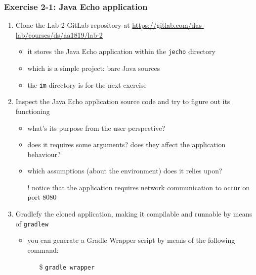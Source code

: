 \documentclass[handout]{beamer}\mode<presentation>{\usetheme{AMSCesenaBleu}}
\begin{document}
\begin{frame}[allowframebreaks]
\frametitle{Exercise 2-1: Java Echo application}
    
    \begin{enumerate}
        \item Clone the Lab-2 GitLab repository at \url{https://gitlab.com/das-lab/courses/ds/aa1819/lab-2} 
        \begin{itemize}
            \item it stores the Java Echo application within the \texttt{jecho} directory
            \item which is a simple project: bare Java sources
            \item the \texttt{im} directory is for the next exercise
        \end{itemize}
        
        \vspace{.5cm}
        
        \item Inspect the Java Echo application source code and try to figure out its functioning
        \begin{itemize}
            \item what's its purpose from the user perspective?
            \item does it requires some arguments? does they affect the application behaviour?
            \item which assumptions (about the environment) does it relies upon?
            \item[!] notice that the application requires network communication to occur on port 8080
        \end{itemize}
        
        \framebreak
        
        \item Gradlefy the cloned application, making it compilable and runnable by means of \texttt{gradlew}
        \begin{itemize}
            \item you can \alert{generate} a Gradle Wrapper script by means of the following command:
            \begin{itemize}
                \item[\$] \texttt{gradle wrapper}
            \end{itemize}
            

\end{itemize}
\end{enumerate}
\end{frame}
\end{document}
